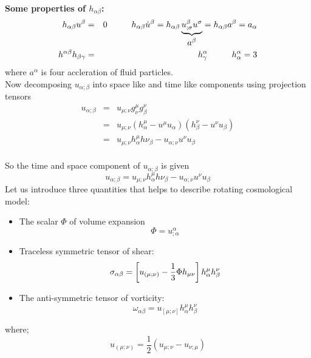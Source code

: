 \textbf{Some properties of $h_{\alpha\beta}$:}
\begin{equation}
\begin{aligned}
h_{\alpha\beta}u^\beta&=&0\hspace{1cm}h_{\alpha\beta}\dot{u}^\beta=h_{\alpha\beta}\underbrace{u^\beta_{;\sigma}u^\sigma}_{\mbox{$a^\beta$}}=h_{\alpha\beta}a^\beta=a_\alpha\\
h^{\alpha\beta}h_{\beta\gamma}&=&h_{\gamma}^{\alpha}\hspace*{1cm} h_{\alpha}^\alpha =3
\end{aligned}
\end{equation}
where $a^\alpha$ is four accleration of fluid particles.\\
Now decomposing $u_{\alpha ;\beta}$ into space like and time like components using projection tensors
\begin{eqnarray*}
u_{\alpha ;\beta}&=& u_{\mu ;\nu}g^\mu_\nu g^\nu_\beta\\
&=& u_{\mu ;\nu}(h^\mu_\alpha-u^\mu u_\alpha)(h^\nu_\beta-u^\nu u_\beta)\\
&=& u_{\mu;\nu}h^\mu_\alpha h\nu_\beta -u_{\alpha;\nu} u^\nu u_\beta
\end{eqnarray*}\\
So the time and space component of  $u_{\alpha ;\beta}$ is given
\begin{equation}\label{u_a_b}
u_{\alpha ;\beta}=u_{\mu;\nu}h^\mu_\alpha h\nu_\beta -u_{\alpha;\nu} u^\nu u_\beta
\end{equation}
Let us introduce three quantities that helps to describe rotating cosmological model:
\begin{itemize}
\item The scalar $\Phi$ of volume expansion\begin{equation}
\Phi=u^\alpha_{;\alpha}
\end{equation}
\item Traceless symmetric tensor of shear:
\begin{equation}
\sigma_{\alpha\beta}=\left[u_{(\mu;\nu)}-\frac{1}{3}\Phi h_{\mu\nu}\right]h^\mu_\alpha h^\nu_\beta$$
\end{equation}
\item The anti-symmetric tensor of vorticity:
\begin{equation}
\omega_{\alpha\beta}=u_{[\mu;\nu]}h^\mu_\alpha h^\nu_\beta
\end{equation}
\end{itemize}
where; $$u_{(\mu;\nu)}=\frac{1}{2}\left(u_{\mu;\nu}-u_{\nu;\mu}\right)$$
